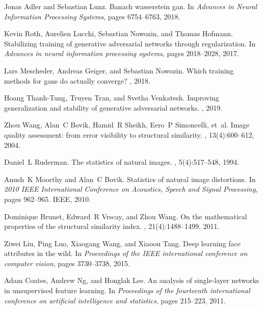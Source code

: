 \documentclass{article}
\begin{document}
\begin{thebibliography}{10}
Jonas Adler and Sebastian Lunz.
\newblock Banach wasserstein gan.
\newblock In {\em Advances in Neural Information Processing Systems}, pages
  6754--6763, 2018.

Kevin Roth, Aurelien Lucchi, Sebastian Nowozin, and Thomas Hofmann.
\newblock Stabilizing training of generative adversarial networks through
  regularization.
\newblock In {\em Advances in neural information processing systems}, pages
  2018--2028, 2017.

Lars Mescheder, Andreas Geiger, and Sebastian Nowozin.
\newblock Which training methods for gans do actually converge?
, 2018.

Hoang Thanh-Tung, Truyen Tran, and Svetha Venkatesh.
\newblock Improving generalization and stability of generative adversarial
  networks.
, 2019.

Zhou Wang, Alan~C Bovik, Hamid~R Sheikh, Eero~P Simoncelli, et~al.
\newblock Image quality assessment: from error visibility to structural
  similarity.
, 13(4):600--612, 2004.

Daniel~L Ruderman.
\newblock The statistics of natural images.
, 5(4):517--548, 1994.

Anush~K Moorthy and Alan~C Bovik.
\newblock Statistics of natural image distortions.
\newblock In {\em 2010 IEEE International Conference on Acoustics, Speech and
  Signal Processing}, pages 962--965. IEEE, 2010.

Dominique Brunet, Edward~R Vrscay, and Zhou Wang.
\newblock On the mathematical properties of the structural similarity index.
, 21(4):1488--1499, 2011.

Ziwei Liu, Ping Luo, Xiaogang Wang, and Xiaoou Tang.
\newblock Deep learning face attributes in the wild.
\newblock In {\em Proceedings of the IEEE international conference on computer
  vision}, pages 3730--3738, 2015.

Adam Coates, Andrew Ng, and Honglak Lee.
\newblock An analysis of single-layer networks in unsupervised feature
  learning.
\newblock In {\em Proceedings of the fourteenth international conference on
  artificial intelligence and statistics}, pages 215--223, 2011.


\end{thebibliography}
\end{document}
